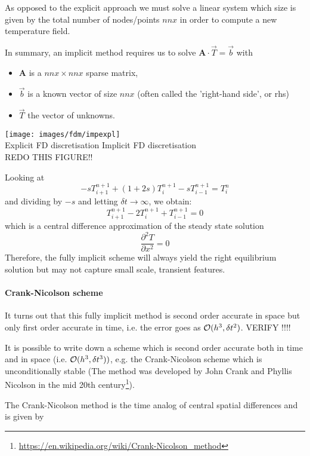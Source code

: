 As opposed to the explicit approach we must solve a linear system which size is given 
by the total number of nodes/points $nnx$ in order to compute a new temperature field.

In summary, an implicit method requires us to solve ${\bm A}\cdot\vec{T} = \vec{b}$ with
\begin{itemize}
\item ${\bm A}$ is a $nnx \times nnx$  {\color{olive}sparse} matrix,
\item ${\vec b}$ is a known vector of size $nnx$ (often called the 'right-hand side', or {\color{olive} rhs})
\item ${\vec T}$ the vector of unknowns.
\end{itemize}

\begin{center}
\texttt{[image: images/fdm/impexpl]}\\
Explicit FD discretisation
\hspace{1cm}
Implicit FD discretisation\\
REDO THIS FIGURE!!
\end{center}

Looking at
\[
-s T_{i+1}^{n+1} + (1+2s) T_{i}^{n+1} - s T_{i-1}^{n+1} = T_i^{n}
\]
and dividing by $-s$ and letting $\delta t \rightarrow \infty$, we obtain:
\[
T_{i+1}^{n+1} -2 T_{i}^{n+1} + T_{i-1}^{n+1} = 0
\]
which is a central difference approximation of the steady state solution
\[
\frac{\partial^2 T }{\partial x^2}=0
\]
Therefore, the fully implicit scheme will always yield the right equilibrium solution 
but may not capture small scale, transient features.


\paragraph{Crank-Nicolson scheme} 
It turns out that this fully implicit method is second order accurate in space but 
only first order accurate in time,
i.e. the error goes as ${\cal O}(h^3,\delta t^2)$.   VERIFY !!!!

It is possible to write down a scheme which is second order accurate both in time and in space
(i.e. ${\cal O}(h^3, \delta t^3))$, e.g. the {\color{olive}Crank-Nicolson} scheme 
which is unconditionally stable (The method was developed by John Crank and Phyllis Nicolson 
in the mid 20th century\footnote{\url{https://en.wikipedia.org/wiki/Crank-Nicolson_method}}).

The Crank-Nicolson method is the time analog of central spatial differences and is given by

